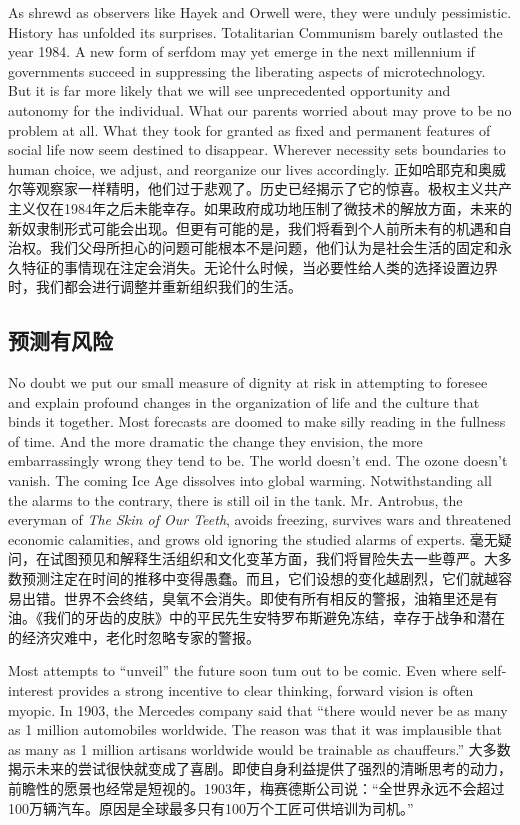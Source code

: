 \begin{Parallel}{97mm}{45mm}
  \ParallelLText
  {As shrewd as observers like Hayek and Orwell were, they were unduly pessimistic. History has unfolded its surprises. Totalitarian Communism barely outlasted the year 1984. A new form of serfdom may yet emerge in the next millennium if governments succeed in suppressing the liberating aspects of microtechnology. But it is far more likely that we will see unprecedented opportunity and autonomy for the individual. What our parents worried about may prove to be no problem at all. What they took for granted as fixed and permanent features of social life now seem destined to disappear. Wherever necessity sets boundaries to human choice, we adjust, and reorganize our lives accordingly. }  
  \ParallelRText
  {\small 正如哈耶克和奥威尔等观察家一样精明，他们过于悲观了。历史已经揭示了它的惊喜。极权主义共产主义仅在1984年之后未能幸存。如果政府成功地压制了微技术的解放方面，未来的新奴隶制形式可能会出现。但更有可能的是，我们将看到个人前所未有的机遇和自治权。我们父母所担心的问题可能根本不是问题，他们认为是社会生活的固定和永久特征的事情现在注定会消失。无论什么时候，当必要性给人类的选择设置边界时，我们都会进行调整并重新组织我们的生活。}
  \ParallelPar

\subsection{预测有风险}


  \ParallelLText
  {No doubt we put our small measure of dignity at risk in attempting to foresee and explain profound changes in the organization of life and the culture that binds it together. Most forecasts are doomed to make silly reading in the fullness of time. And the more dramatic the change they envision, the more embarrassingly wrong they tend to be. The world doesn't end. The ozone doesn't vanish. The coming Ice Age dissolves into global warming. Notwithstanding all the alarms to the contrary, there is still oil in the tank. Mr. Antrobus, the everyman of \emph{The Skin of Our Teeth}, avoids freezing, survives wars and threatened economic calamities, and grows old ignoring the studied alarms of experts.  }  
  \ParallelRText
  {\small 毫无疑问，在试图预见和解释生活组织和文化变革方面，我们将冒险失去一些尊严。大多数预测注定在时间的推移中变得愚蠢。而且，它们设想的变化越剧烈，它们就越容易出错。世界不会终结，臭氧不会消失。即使有所有相反的警报，油箱里还是有油。《我们的牙齿的皮肤》中的平民先生安特罗布斯避免冻结，幸存于战争和潜在的经济灾难中，老化时忽略专家的警报。 }
  \ParallelPar


  \ParallelLText
  {Most attempts to “unveil” the future soon tum out to be comic. Even where self-interest provides a strong incentive to clear thinking, forward vision is often myopic. In 1903, the Mercedes company said that “there would never be as many as 1 million automobiles worldwide. The reason was that it was implausible that as many as 1 million artisans worldwide would be trainable as chauffeurs.”}  
  \ParallelRText
  {\small 大多数揭示未来的尝试很快就变成了喜剧。即使自身利益提供了强烈的清晰思考的动力，前瞻性的愿景也经常是短视的。1903年，梅赛德斯公司说：“全世界永远不会超过100万辆汽车。原因是全球最多只有100万个工匠可供培训为司机。”}
  \ParallelPar



\end{Parallel}
